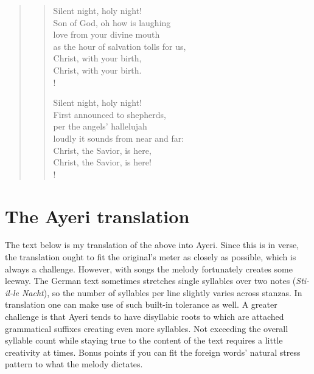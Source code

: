 \documentclass[12pt,paper=a4]{scrartcl}
\newcommand{\fw}[1]{\textit{#1}} %
\begin{document}
\begin{quote}
\begin{minipage}{.5\linewidth}
\begin{verse}
\begin{patverse}
Silent night, holy night!\\
Son of God, oh how is laughing\\
love from your divine mouth\\
as the hour of salvation tolls for us,\\
Christ, with your birth,\\
Christ, with your birth.\\!
\end{patverse}

\begin{patverse}
Silent night, holy night!\\
First announced to shepherds,\\
per the angels' hallelujah\\
loudly it sounds from near and far:\\
Christ, the Savior, is here,\\
Christ, the Savior, is here!\\!
\end{patverse}
\end{verse}
\end{minipage}
\end{quote}

\section{The Ayeri translation}
The text below is my translation of the above into Ayeri. Since this is in
verse, the translation ought to fit the original's meter as closely as
possible, which is always a challenge. However, with songs the melody
fortunately creates some leeway. The German text sometimes stretches single
syllables over two notes (\fw{Sti-il-le Nacht}), so the number of syllables per
line slightly varies across stanzas. In translation one can make use of such
built-in tolerance as well. A greater challenge is that Ayeri tends to have
disyllabic roots to which are attached grammatical suffixes creating even more
syllables. Not exceeding the overall syllable count while staying true to
the content of the text requires a little creativity at times. Bonus points if
you can fit the foreign words' natural stress pattern to what the melody
dictates.
\end{document}
